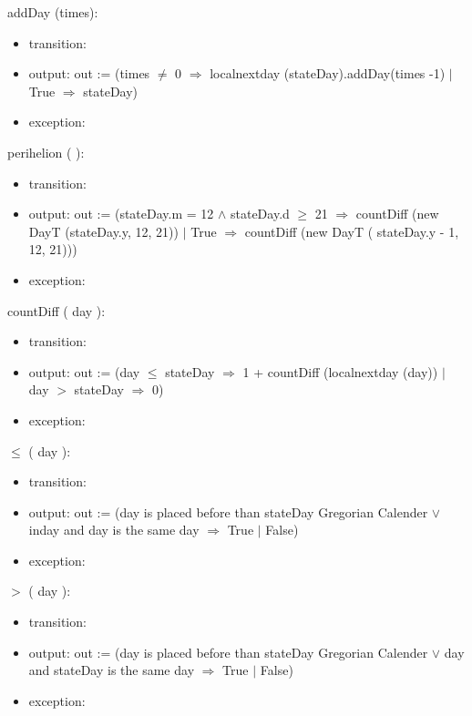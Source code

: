 \documentclass[12pt, titlepage]{article}
\begin{document}
\noindent  addDay (times):
\begin{itemize}
\item transition: 
\item output: out := (times $\ne$ 0 $\Rightarrow$ localnextday (stateDay).addDay(times -1) $|$ True $\Rightarrow$ stateDay)

\item exception:
\end{itemize}

\noindent  perihelion ( ):
\begin{itemize}
\item transition: 
\item output: out := (stateDay.m = 12 $	\wedge$ stateDay.d $\geq	$ 21 $\Rightarrow$  countDiff (new DayT (stateDay.y, 12, 21)) $|$ True $\Rightarrow$ countDiff (new DayT ( stateDay.y - 1, 12, 21)))
\item exception:
\end{itemize}

\noindent  countDiff ( day ):
\begin{itemize}
\item transition: 
\item output: out := (day $\leq$ stateDay $\Rightarrow$ 1 + countDiff (localnextday (day)) $|$ day $>$  stateDay $\Rightarrow$ 0)
\item exception:
\end{itemize}


\noindent  $\leq$ ( day ):
\begin{itemize}
\item transition: 
\item output: out := (day is placed before than stateDay Gregorian Calender $\lor	$ inday and day is the same day $\Rightarrow$ True $|$ False)
\item exception:
\end{itemize}

\noindent $>$  ( day ):
\begin{itemize}
\item transition: 
\item output: out := (day is placed before than stateDay Gregorian Calender $\lor	$ day and stateDay is the same day $\Rightarrow$ True $|$ False)
\item exception:
\end{itemize}
\end{document}
